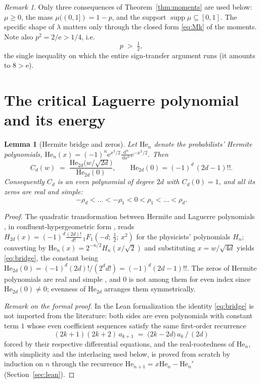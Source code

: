 \documentclass[11pt]{amsart}
\newtheorem{lemma}[theorem]{Lemma}
\theoremstyle{definition}
\theoremstyle{remark}
\newtheorem{remark}[theorem]{Remark}
\newcommand{\dd}{\,\mathrm{d}}
\newcommand{\e}{\mathrm{e}}
\newcommand{\He}{\mathrm{He}}
\newcommand{\hypF}[3]{{}_1F_1\!\left(#1;\,#2;\,#3\right)}
\begin{document}
\begin{remark}
Only three consequences of Theorem~\ref{thm:moments} are used below:
$\mu\ge0$, the mass $\mu((0,1])=1-p$, and the support
$\operatorname{supp}\mu\subseteq[0,1]$. The specific shape of
$\lambda$ matters only through the closed form \eqref{eq:Mk} of the
moments. Note also $p^2=2/\e>1/4$, i.e.
\begin{equation}\label{eq:phalf}
p\;>\;\tfrac12 ,
\end{equation}
the single inequality on which the entire sign-transfer argument runs
(it amounts to $8>\e$).
\end{remark}

\section{The critical Laguerre polynomial and its energy}\label{sec:laguerre}

\begin{lemma}[Hermite bridge and zeros]\label{lem:hermite}
Let $\He_n$ denote the probabilists' Hermite polynomials,
$\He_n(x)=(-1)^n\e^{x^2/2}\frac{\dd^n}{\dd x^n}\e^{-x^2/2}$. Then
\begin{equation}\label{eq:bridge}
C_d(w)\;=\;\frac{\He_{2d}\bigl(w/\sqrt{2d}\bigr)}{\He_{2d}(0)},
\qquad
\He_{2d}(0)=(-1)^d\,(2d-1)!! .
\end{equation}
Consequently $C_d$ is an even polynomial of degree $2d$ with
$C_d(0)=1$, and all its zeros are real and simple:
\[
-\rho_d<\dots<-\rho_1<0<\rho_1<\dots<\rho_d .
\]
\end{lemma}

\begin{proof}
The quadratic transformation between Hermite and Laguerre polynomials
\cite[(5.6.1)]{szego}, in confluent-hypergeometric form
\cite[Ch.~18]{dlmf}, reads
$H_{2d}(x)=(-1)^d\frac{(2d)!}{d!}\,\hypF{-d}{\tfrac12}{x^2}$ for the
physicists' polynomials $H_n$; converting by
$\He_n(x)=2^{-n/2}H_n(x/\sqrt2)$ and substituting $x=w/\sqrt{4d}$
yields \eqref{eq:bridge}, the constant being
$\He_{2d}(0)=(-1)^d(2d)!/(2^d d!)=(-1)^d(2d-1)!!$. The zeros of
Hermite polynomials are real and simple \cite[Thm.~3.3.1]{szego}, and
$0$ is not among them for even index since $\He_{2d}(0)\neq 0$;
evenness of $\He_{2d}$ arranges them symmetrically.

\emph{Remark on the formal proof.} In the Lean formalization the
identity \eqref{eq:bridge} is not imported from the literature: both
sides are even polynomials with constant term $1$ whose even
coefficient sequences satisfy the same first-order recurrence
\[
(2k+1)(2k+2)\,a_{k+1}\;=\;\bigl(2k-2d\bigr)\,a_k\,/\,(2d)
\]
forced by their respective differential equations, and the
real-rootedness of $\He_n$, with simplicity and the interlacing used
below, is proved from scratch by induction on $n$ through the
recurrence $\He_{n+1}=x\He_n-\He_n'$ (Section~\ref{sec:lean}).
\end{proof}
\end{document}
